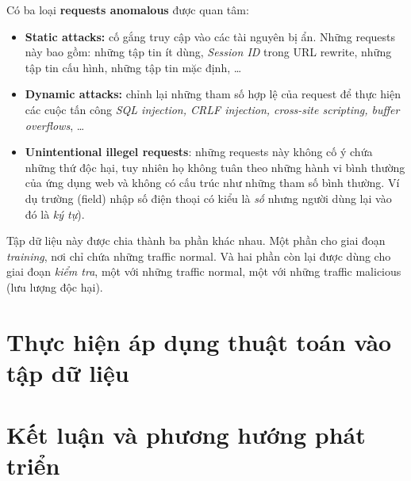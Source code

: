 \documentclass[../main-report.tex]{subfiles}
\begin{document}
Có ba loại \textbf{requests anomalous} được quan tâm:

\begin{itemize}
\item \textbf{Static attacks:} cố gắng truy cập vào các tài nguyên bị ẩn. Những requests này bao gồm: những tập tin ít dùng, \emph{Session ID} trong URL rewrite, những tập tin cấu hình, những tập tin mặc định, \ldots
\item \textbf{Dynamic attacks:} chỉnh lại những tham số hợp lệ của request để thực hiện các cuộc tấn công \emph{SQL injection, CRLF injection, cross-site scripting,  buffer overflows}, \ldots
\item \textbf{Unintentional illegel requests}: những requests này không cố ý chứa những thứ độc hại, tuy nhiên họ không tuân theo những hành vi bình thường của ứng dụng web và không có cấu trúc như những tham số bình thường. Ví dụ trường (field) nhập số điện thoại có kiểu là \emph{số} nhưng người dùng lại vào đó là \emph{ký tự}).
\end{itemize}

Tập dữ liệu này được chia thành ba phần khác nhau. Một phần cho giai đoạn \emph{training}, nơi chỉ chứa những traffic normal. Và hai phần còn lại được dùng cho giai đoạn \emph{kiểm tra}, một với những traffic normal, một với những traffic malicious (lưu lượng độc hại).

\section{Thực hiện áp dụng thuật toán vào tập dữ liệu}

\section{Kết luận và phương hướng phát triển}
\end{document}
